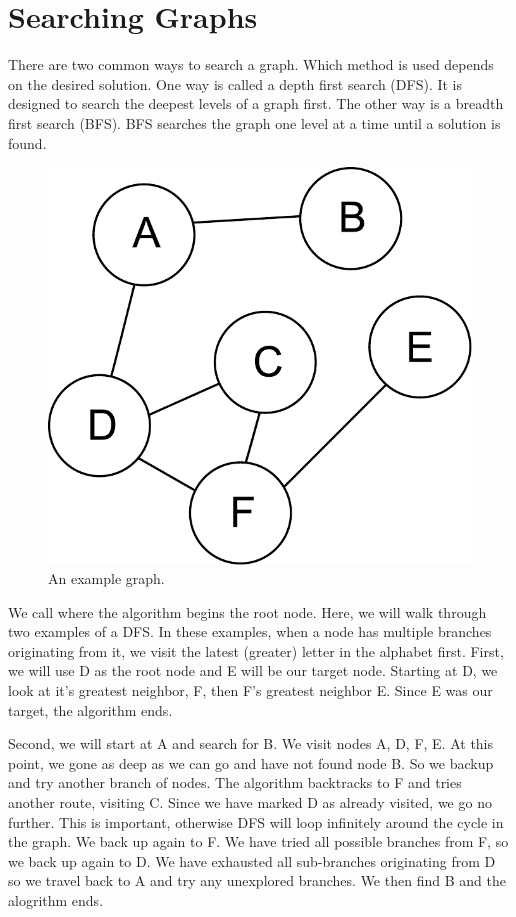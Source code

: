 \label{lab:SixDegreesKevinBacon}

\section*{Searching Graphs}
There are two common ways to search a graph.
Which method is used depends on the desired solution.
One way is called a depth first search (DFS).  It is designed to search the deepest levels of a graph first.
The other way is a breadth first search (BFS).  BFS searches the graph one level at a time until a solution is found.
\begin{figure}[h]
\centering
\includegraphics[width=.5\textwidth]{graph.pdf}
\caption{An example graph.}
\label{fig:bfs_dfs_graph}
\end{figure}

We call where the algorithm begins the root node.
Here, we will walk through two examples of a DFS.
In these examples, when a node has multiple branches originating from it, we visit the latest (greater) letter in the alphabet first.
First, we will use D as the root node and E will be our target node.
Starting at D, we look at it's greatest neighbor, F, then F's greatest neighbor E.
Since E was our target, the algorithm ends.

Second, we will start at A and search for B. 
We visit nodes A, D, F, E.
At this point, we gone as deep as we can go and have not found node B.
So we backup and try another branch of nodes.
The algorithm backtracks to F and tries another route, visiting C.
Since we have marked D as already visited, we go no further.
This is important, otherwise DFS will loop infinitely around the cycle in the graph.
We back up again to F.  We have tried all possible branches from F, so we back up again to D.
We have exhausted all sub-branches originating from D so we travel back to A and try any unexplored branches.
We then find B and the alogrithm ends.

